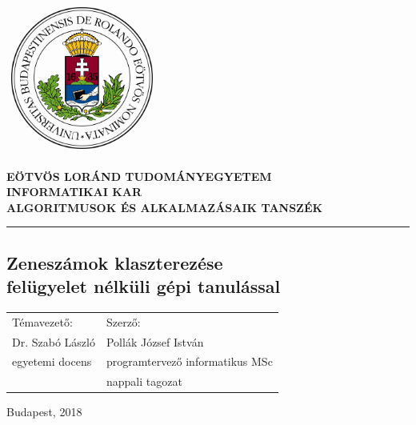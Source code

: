 \newcommand{\nocontentsline}[3]{}
\newcommand{\tocless}[2]{\bgroup\let\addcontentsline=\nocontentsline#1*{#2}\egroup}

\begin{minipage}{0.2\textwidth}
    \includegraphics[width=5cm, height=5cm]{src/images/elte.jpg}
\end{minipage}%
%
\hfill
\begin{minipage}{0.65\textwidth}
\begin{center}
    \uppercase{\textbf{Eötvös Loránd Tudományegyetem}}\\
    \uppercase{\textbf{Informatikai kar}}\\\vspace{5mm}
    \uppercase{\textbf{Algoritmusok és Alkalmazásaik Tanszék}}
\end{center}
\end{minipage}

\rule{\textwidth}{1pt}

\vspace{1cm}

\begin{center}
    \tocless\section{Zeneszámok klaszterezése\\felügyelet nélküli gépi tanulással}
\end{center}

\vspace{5cm}

\begin{tabularx}{\textwidth}{Xl}
Témavezető: & Szerző:\\
Dr. Szabó László & Pollák József István\\
egyetemi docens & programtervező informatikus MSc\\
& nappali tagozat\\
\end{tabularx}

\vspace{2.5cm}

\begin{center}
    Budapest, 2018
\end{center}

\thispagestyle{empty}
\pagebreak